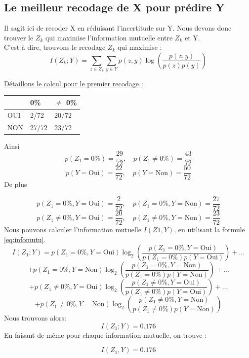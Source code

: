 \documentclass{article}
\begin{document}
\subsection{Le meilleur recodage de X pour prédire Y }

Il sagit ici de recoder X en réduisant l'incertitude sur Y.
Nous devons donc trouver le $Z_k$ qui maximise l'information mutuelle entre $Z_k$ et Y.
\\
C'est à dire, trouvons le recodage $Z_k$ qui maximise :
\begin{equation}
  I(Z_k; Y) = \sum_{z\in Z_k} \sum_{y \in Y} p(z, y) \log \left( \frac{p(z, y)}{p(z)p(y)} \right)
  \label{eq:infomutu}
\end{equation}

\underline{Détaillons le calcul pour le premier recodage :}

\begin{table}[H]
  \centering
  \begin{tabular}{|l|l|l|}
  \hline
      & 0\%   & $\neq$ 0\% \\ \hline
  OUI & 2/72  & 20/72 \\ \hline
  NON & 27/72 & 23/72 \\ \hline
  \end{tabular}
  \end{table}
Ainsi
\[
p(Z_1 = 0\%) = \frac{29}{72}, \quad p(Z_1 \neq 0\%) = \frac{43}{72}
\]
\[
p(Y = \text{Oui}) = \frac{22}{72}, \quad p(Y = \text{Non}) = \frac{50}{72}
\]
De plus

\[
p(Z_1 = 0\%, Y = \text{Oui}) = \frac{2}{72}, \quad p(Z_1 = 0\%, Y = \text{Non}) = \frac{27}{72}
\]
\[
p(Z_1 \neq 0\%, Y = \text{Oui}) = \frac{20}{72}, \quad p(Z_1 \neq 0\%, Y = \text{Non}) = \frac{23}{72}
\]
Nous pouvons calculer l'information mutuelle $I(Z1,Y)$, en utilisant la formule \ref{eq:infomutu}.
\[
I(Z_1; Y) = p(Z_1 = 0\%, Y = \text{Oui}) \log_2 \left(\frac{p(Z_1 = 0\%, Y = \text{Oui})}{p(Z_1 = 0\%) p(Y = \text{Oui})}\right) + \ldots
\]
\[
+ p(Z_1 = 0\%, Y = \text{Non}) \log_2 \left(\frac{p(Z_1 = 0\%, Y = \text{Non})}{p(Z_1 = 0\%) p(Y = \text{Non})}\right) + \ldots
\]
\[
+ p(Z_1 \neq 0\%, Y = \text{Oui}) \log_2 \left(\frac{p(Z_1 \neq 0\%, Y = \text{Oui})}{p(Z_1 \neq 0\%) p(Y = \text{Oui})}\right) + \ldots
\]
\[
+ p(Z_1 \neq 0\%, Y = \text{Non}) \log_2 \left(\frac{p(Z_1 \neq 0\%, Y = \text{Non})}{p(Z_1 \neq 0\%) p(Y = \text{Non})}\right)
\]
Nous trouvons alors:
\[
  I(Z_1; Y)= 0.176
\]
En faisant de même pour chaque information mutuelle, on trouve : 

\[
I(Z_1,Y) = 0.176
\]
\end{document}
